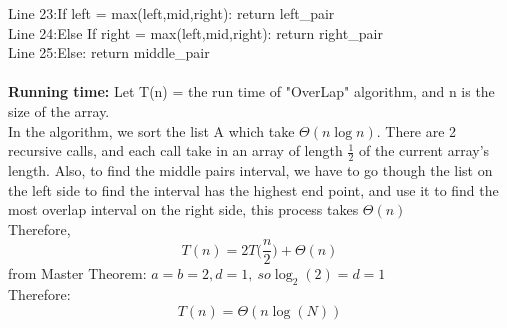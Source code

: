 \documentclass[11pt]{article}
\newcommand{\tab}{\hspace*{2em}}
\begin{document}
Line 23:\tab\tab If left = max(left,mid,right): return left\_pair\\
Line 24:\tab\tab Else If right = max(left,mid,right): return right\_pair\\
Line 25:\tab\tab Else: return middle\_pair\\
\\
\noindent
\textbf{Running time:}
Let T(n) = the run time of "OverLap" algorithm, and n is the size of the array.\\
In the algorithm, we sort the list A which take $\Theta(n\log n)$.
There are 2 recursive calls, and each call take in an array of length $\frac{1}{2}$ of the current array's length. Also, to find the middle pairs interval, we have to go though the list on the left side to find the interval has the highest end point, and use it to find the most overlap interval on the right side, this process takes $\Theta(n)$\\
Therefore,
$$T(n) = 2T\Big(\frac{n}{2}\Big) + \Theta(n)$$ 
from Master Theorem: $a = b = 2, d = 1,\ so \log_2(2) = d = 1$\\
Therefore:
$$\boxed{T(n) = \Theta(n\log(N))}$$
\end{document}
